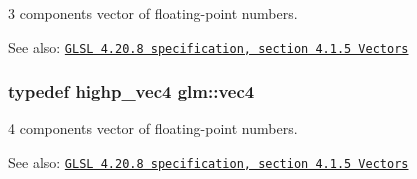3 components vector of floating-point numbers.

\begin{Desc}
\item[See also:]\href{http://www.opengl.org/registry/doc/GLSLangSpec.4.20.8.pdf}{\tt GLSL 4.20.8 specification, section 4.1.5 Vectors} \end{Desc}
\hypertarget{group__core__types_g5881b1b022d7fd1b7218f5916532dd02}{
\subsubsection[vec4]{\setlength{\rightskip}{0pt plus 5cm}typedef highp\_\-vec4 {\bf glm::vec4}}}
\label{group__core__types_g5881b1b022d7fd1b7218f5916532dd02}


4 components vector of floating-point numbers.

\begin{Desc}
\item[See also:]\href{http://www.opengl.org/registry/doc/GLSLangSpec.4.20.8.pdf}{\tt GLSL 4.20.8 specification, section 4.1.5 Vectors} \end{Desc}
